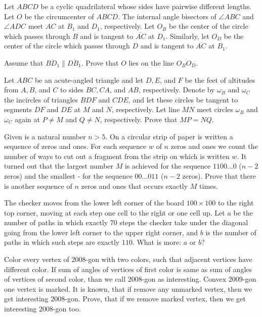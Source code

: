 \documentclass[11pt]{scrartcl}
\begin{document}
\begin{problem}[6025085618534905645]
	Let $ABCD$ be a cyclic quadrilateral whose sides have pairwise different lengths. Let $O$ be the circumcenter of $ABCD$. The internal angle bisectors of $\angle ABC$ and $\angle ADC$ meet $AC$ at $B_1$ and $D_1$, respectively. Let $O_B$ be the center of the circle which passes through $B$ and is tangent to $\overline{AC}$ at $D_1$. Similarly, let $O_D$ be the center of the circle which passes through $D$ and is tangent to $\overline{AC}$ at $B_1$.

Assume that $\overline{BD_1} \parallel \overline{DB_1}$. Prove that $O$ lies on the line $\overline{O_BO_D}$.
\end{problem}
\begin{problem}[57940096937913]
Let $ABC$ be an acute-angled triangle and let $D, E$, and $F$ be the feet of altitudes from $A, B$, and $C$ to sides $BC, CA$, and $AB$, respectively. Denote by $\omega_B$ and $\omega_C$ the incircles of triangles $BDF$ and $CDE$, and let these circles be tangent to segments $DF$ and $DE$ at $M$ and $N$, respectively. Let line $MN$ meet circles $\omega_B$ and $\omega_C$ again at $P \ne M$ and $Q \ne N$, respectively. Prove that $MP = NQ$.
\end{problem}
\begin{problem}[314213229221479]
	Given is a natural number $n > 5$. On a circular strip of paper is written a sequence of zeros and ones. For each sequence $w$ of $n$ zeros and ones we count the number of ways to cut out a fragment from the strip on which is written $w$. It turned out that the largest number $M$ is achieved for the sequence $11 00...0$ ($n-2$ zeros) and the smallest - for the sequence $00...011$ ($n-2$ zeros). Prove that there is another sequence of $n$ zeros and ones that occurs exactly $M$ times.
\end{problem}
\begin{problem}[677860185151955]
	The checker moves from the lower left corner of the board $100 \times 100$ to the right top corner, moving at each step one cell to the right or one cell up. Let $a$ be the number of paths in which exactly $70$ steps the checker take under the diagonal going from the lower left corner to the upper right corner, and $b$ is the number of paths in which such steps are exactly $110$. What is more: $a$ or $b$?
\end{problem}
\begin{problem}[8757490679465390171]
	Color every vertex of $2008$-gon with two colors, such that adjacent vertices have different color. If sum of angles of vertices of first color is same as sum of angles of vertices of second color, than we call $2008$-gon as interesting.
Convex $2009$-gon one vertex is marked. It is known, that if remove any unmarked vertex, then we get interesting $2008$-gon. Prove, that if we remove marked vertex, then we get interesting $2008$-gon too.
\end{problem}
\end{document}
